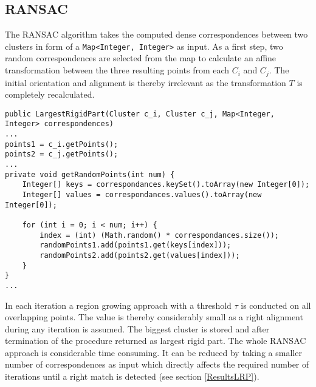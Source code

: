 \subsection{RANSAC}
\label{RANSAC}
The RANSAC algorithm takes the computed dense correspondences between two clusters in form of a \texttt{Map<Integer, Integer>} as input. As a first step, two random correspondences are selected from the map to calculate an affine transformation between the three resulting points from each $C_i$ and $C_j$. The initial orientation and alignment is thereby irrelevant as the transformation $T$ is completely recalculated.
\begin{lstlisting}
public LargestRigidPart(Cluster c_i, Cluster c_j, Map<Integer, Integer> correspondences)
...
points1 = c_i.getPoints();
points2 = c_j.getPoints();
...
private void getRandomPoints(int num) {
	Integer[] keys = correspondances.keySet().toArray(new Integer[0]);
	Integer[] values = correspondances.values().toArray(new Integer[0]);

	for (int i = 0; i < num; i++) {
		index = (int) (Math.random() * correspondances.size());
		randomPoints1.add(points1.get(keys[index]));
		randomPoints2.add(points2.get(values[index]));
	}
}
...
\end{lstlisting}
In each iteration a region growing approach with a threshold $\tau$ is conducted on all overlapping points. The value is thereby considerably small as a right alignment during any iteration is assumed. The biggest cluster is stored and after termination of the procedure returned as largest rigid part. The whole RANSAC approach is considerable time consuming. It can be reduced by taking a smaller number of correspondences as input which directly affects the required number of iterations until a right match is detected (see section \ref{ResultsLRP}).

